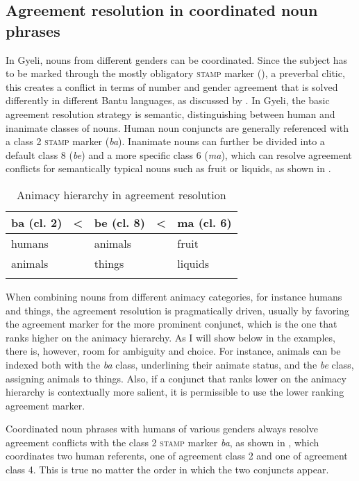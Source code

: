 \subsection{Agreement resolution in coordinated noun phrases}

In Gyeli, nouns from different genders can be coordinated. Since the subject has to be marked through the mostly obligatory \textsc{stamp} marker (), a preverbal clitic, this creates a conflict in terms of number and gender agreement that is solved differently in different Bantu languages, as discussed by \citet[283]{downing2019}.  In Gyeli, the basic agreement resolution strategy is semantic, distinguishing between human and inanimate classes of nouns. Human noun conjuncts are generally referenced with a class 2 \textsc{stamp} marker ({\itshape ba}).  Inanimate nouns can further be divided into a default class 8 ({\itshape be}) and a more specific class 6 ({\itshape ma}), which can resolve agreement conflicts for semantically typical nouns such as fruit or liquids, as shown in .  

\begin{table}
\begin{tabular}{ll ll l}
 \lsptoprule
ba (cl. 2) & <  & be (cl. 8)  & < & ma (cl. 6) \\
\midrule
humans &     &     animals &  &     fruit \\
animals   &  &     things   &  &    liquids \\
 \lspbottomrule
\end{tabular}
\caption{Animacy hierarchy in agreement resolution}
\label{Tab:AGRresol}
\end{table} 

When combining nouns from different animacy categories, for instance humans and things, the agreement resolution is pragmatically driven, usually by favoring the agreement marker for the more prominent conjunct, which is the one that ranks higher on the animacy hierarchy. As I will show below in the examples, there is, however, room for ambiguity and choice. For instance, animals can be indexed both with the {\itshape ba} class, underlining their animate status, and the {\itshape be} class, assigning animals to things. Also, if a conjunct that ranks lower on the animacy hierarchy is contextually more salient, it is permissible to use the lower ranking agreement marker. 

Coordinated noun phrases with humans of various genders always resolve agreement conflicts with the class 2 \textsc{stamp} marker {\itshape ba}, as shown in , which coordinates two human referents, one of agreement class 2 and one of agreement class 4.  This is true no matter the order in which the two conjuncts appear. 

